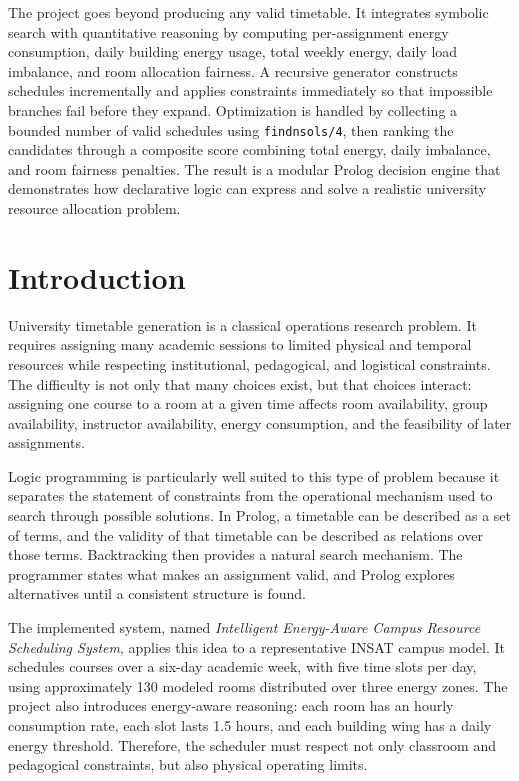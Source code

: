 \documentclass[12pt,a4paper]{article}
\newcommand{\predicate}[1]{\texttt{#1}}
\begin{document}
The project goes beyond producing any valid timetable. It integrates symbolic search with quantitative reasoning by computing per-assignment energy consumption, daily building energy usage, total weekly energy, daily load imbalance, and room allocation fairness. A recursive generator constructs schedules incrementally and applies constraints immediately so that impossible branches fail before they expand. Optimization is handled by collecting a bounded number of valid schedules using \predicate{findnsols/4}, then ranking the candidates through a composite score combining total energy, daily imbalance, and room fairness penalties. The result is a modular Prolog decision engine that demonstrates how declarative logic can express and solve a realistic university resource allocation problem.

\section{Introduction}

University timetable generation is a classical operations research problem. It requires assigning many academic sessions to limited physical and temporal resources while respecting institutional, pedagogical, and logistical constraints. The difficulty is not only that many choices exist, but that choices interact: assigning one course to a room at a given time affects room availability, group availability, instructor availability, energy consumption, and the feasibility of later assignments.

Logic programming is particularly well suited to this type of problem because it separates the statement of constraints from the operational mechanism used to search through possible solutions. In Prolog, a timetable can be described as a set of terms, and the validity of that timetable can be described as relations over those terms. Backtracking then provides a natural search mechanism. The programmer states what makes an assignment valid, and Prolog explores alternatives until a consistent structure is found.

The implemented system, named \emph{Intelligent Energy-Aware Campus Resource Scheduling System}, applies this idea to a representative INSAT campus model. It schedules courses over a six-day academic week, with five time slots per day, using approximately 130 modeled rooms distributed over three energy zones. The project also introduces energy-aware reasoning: each room has an hourly consumption rate, each slot lasts 1.5 hours, and each building wing has a daily energy threshold. Therefore, the scheduler must respect not only classroom and pedagogical constraints, but also physical operating limits.
\end{document}
